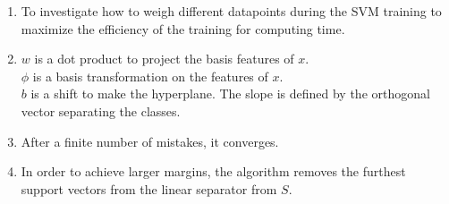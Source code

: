 \documentclass[submit]{harvardml}
\begin{document}
\begin{enumerate}
    \item
        To investigate how to weigh different datapoints during the SVM
        training to maximize the efficiency of the training for computing time.
    \item
        $w$ is a dot product to project the basis features of $x$. \\
        $\phi$ is a basis transformation on the features of $x$. \\
        $b$ is a shift to make the hyperplane. The slope is defined by the
        orthogonal vector separating the classes.
    \item
        After a finite number of mistakes, it converges.
    \item
        In order to achieve larger margins, the algorithm removes the furthest
        support vectors from the linear separator from $S$.
\end{enumerate}
\end{document}
